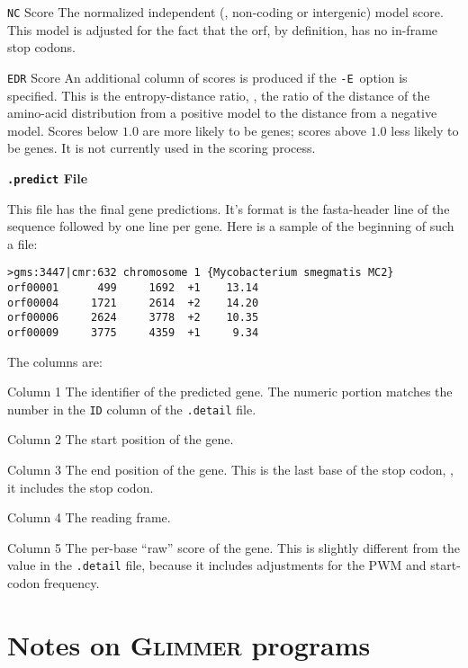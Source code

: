 \documentclass[fleqn,titlepage,11pt]{article}
\def\Glimmer{\textsc{Glimmer}}
\def\Pg#1{\texttt{#1}}
\begin{document}
\item[\Pg{NC} Score]
  The normalized independent (\ie, non-coding or intergenic) model score.  This model
  is adjusted for the fact that the orf, by definition, has no in-frame stop codons.

\item[\Pg{EDR} Score]
  An additional column of scores is produced if the \Pg{-E}~option
  is specified.
  This is the entropy-distance ratio, \ie, the ratio of the distance
  of the amino-acid distribution from a positive model to the distance
  from a negative model.  Scores below $1.0$ are more likely to be genes;
  scores above $1.0$ less likely to be genes.
  It is not currently used in the scoring process.
\el

\smallskip
\noindent\textbf{\Pg{.predict} File}
\smallskip

This file has the final gene predictions.  It's format is the fasta-header
line of the sequence followed by one line per gene.  Here is a sample of the
beginning of such a file:
\BSV
\begin{verbatim}
>gms:3447|cmr:632 chromosome 1 {Mycobacterium smegmatis MC2}
orf00001      499     1692  +1    13.14
orf00004     1721     2614  +2    14.20
orf00006     2624     3778  +2    10.35
orf00009     3775     4359  +1     9.34
\end{verbatim}
\ESV
The columns are:
\RaggedRight
\item[Column 1]
  The identifier of the predicted gene.  The numeric portion matches the
  number in the \Pg{ID} column of the \Pg{.detail} file.

\item[Column 2]
  The start position of the gene.

\item[Column 3]
  The end position of the gene.  This is the last base of the stop codon, \ie,
  it includes the stop codon.

\item[Column 4]
  The reading frame.

\item[Column 5]
  The per-base ``raw'' score of the gene.  This is slightly different from the
  value in the \Pg{.detail} file, because it includes adjustments for the
  PWM and start-codon frequency.
\el


\section{Notes on \Glimmer{} programs}
\end{document}
